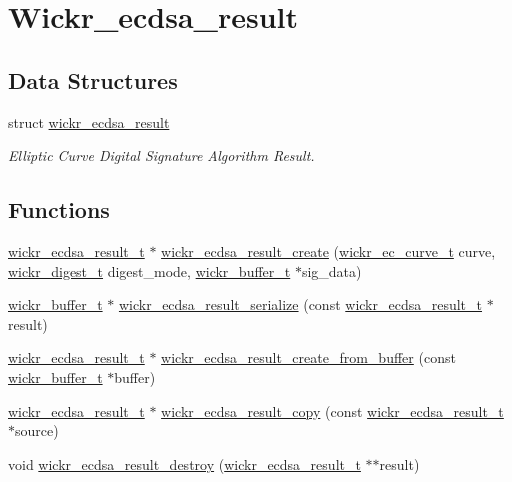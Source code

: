 \hypertarget{group__wickr__ecdsa__result}{}\section{Wickr\+\_\+ecdsa\+\_\+result}
\label{group__wickr__ecdsa__result}
\subsection*{Data Structures}
\begin{DoxyCompactItemize}
\item 
struct \mbox{\hyperlink{structwickr__ecdsa__result}{wickr\+\_\+ecdsa\+\_\+result}}
\begin{DoxyCompactList}\small\item\em Elliptic Curve Digital Signature Algorithm Result. \end{DoxyCompactList}\end{DoxyCompactItemize}
\subsection*{Functions}
\begin{DoxyCompactItemize}
\item 
\mbox{\hyperlink{structwickr__ecdsa__result}{wickr\+\_\+ecdsa\+\_\+result\+\_\+t}} $\ast$ \mbox{\hyperlink{group__wickr__ecdsa__result_ga7e199a7c851fd07fb93180fb3a242749}{wickr\+\_\+ecdsa\+\_\+result\+\_\+create}} (\mbox{\hyperlink{structwickr__ec__curve}{wickr\+\_\+ec\+\_\+curve\+\_\+t}} curve, \mbox{\hyperlink{structwickr__digest}{wickr\+\_\+digest\+\_\+t}} digest\+\_\+mode, \mbox{\hyperlink{structwickr__buffer}{wickr\+\_\+buffer\+\_\+t}} $\ast$sig\+\_\+data)
\item 
\mbox{\hyperlink{structwickr__buffer}{wickr\+\_\+buffer\+\_\+t}} $\ast$ \mbox{\hyperlink{group__wickr__ecdsa__result_ga417d1186e93d6ae4ee4cf701a2bfb1b2}{wickr\+\_\+ecdsa\+\_\+result\+\_\+serialize}} (const \mbox{\hyperlink{structwickr__ecdsa__result}{wickr\+\_\+ecdsa\+\_\+result\+\_\+t}} $\ast$result)
\item 
\mbox{\hyperlink{structwickr__ecdsa__result}{wickr\+\_\+ecdsa\+\_\+result\+\_\+t}} $\ast$ \mbox{\hyperlink{group__wickr__ecdsa__result_gaa3a5ba5ce3df076cf5a9984f68e34c3a}{wickr\+\_\+ecdsa\+\_\+result\+\_\+create\+\_\+from\+\_\+buffer}} (const \mbox{\hyperlink{structwickr__buffer}{wickr\+\_\+buffer\+\_\+t}} $\ast$buffer)
\item 
\mbox{\hyperlink{structwickr__ecdsa__result}{wickr\+\_\+ecdsa\+\_\+result\+\_\+t}} $\ast$ \mbox{\hyperlink{group__wickr__ecdsa__result_ga8664bbdec0bc8b354b3cb35704c42f57}{wickr\+\_\+ecdsa\+\_\+result\+\_\+copy}} (const \mbox{\hyperlink{structwickr__ecdsa__result}{wickr\+\_\+ecdsa\+\_\+result\+\_\+t}} $\ast$source)
\item 
void \mbox{\hyperlink{group__wickr__ecdsa__result_ga84fb120b34b4b7ede4042009c735ea5d}{wickr\+\_\+ecdsa\+\_\+result\+\_\+destroy}} (\mbox{\hyperlink{structwickr__ecdsa__result}{wickr\+\_\+ecdsa\+\_\+result\+\_\+t}} $\ast$$\ast$result)
\end{DoxyCompactItemize}


